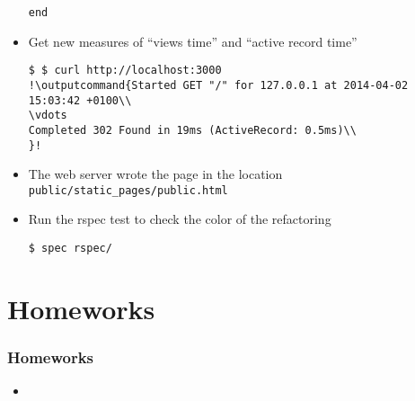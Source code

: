 \documentclass{beamer}
\newcommand{\outputcommand}[1]{\color{darkgreen}{#1}}
\begin{document}
\begin{frame}
\begin{itemize}
\begin{lstlisting}
end
\end{lstlisting}

\item Get new measures of ``views time'' and ``active record time''

\lstset{language=shell}
\begin{lstlisting}[escapechar=!]
$ $ curl http://localhost:3000
!\outputcommand{Started GET "/" for 127.0.0.1 at 2014-04-02 15:03:42 +0100\\
\vdots
Completed 302 Found in 19ms (ActiveRecord: 0.5ms)\\
}!
\end{lstlisting}

\item The web server wrote the page in the location \texttt{public/static\_pages/public.html}

\item Run the rspec test to check the color of the refactoring

\lstset{language=shell}
\begin{lstlisting}
$ spec rspec/
\end{lstlisting}
\end{itemize}


\end{frame}

\section{Homeworks}
\begin{frame}[fragile]
\frametitle{Homeworks}
\begin{itemize}
\item 
\end{itemize}

\end{frame}
\end{document}
